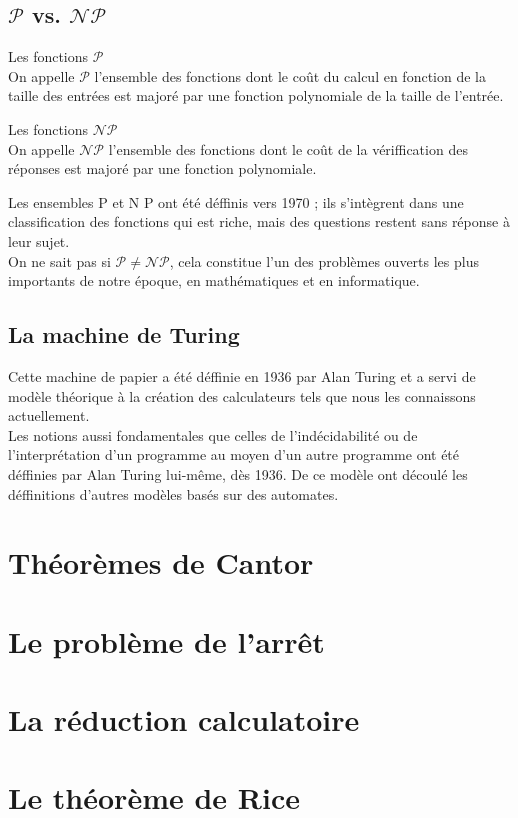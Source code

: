    \subsection{\(\mathcal{P}\) vs. \(\mathcal{NP}\)}

    \begin{definition}
        Les fonctions \(\mathcal{P}\)\\
        On appelle \(\mathcal{P}\) l'ensemble des fonctions dont le coût du calcul en fonction de la taille des entrées est majoré par une fonction polynomiale de la taille de l'entrée.
    \end{definition}
    \begin{definition}
        Les fonctions \(\mathcal{NP}\)\\
        On appelle \(\mathcal{NP}\) l'ensemble des fonctions dont le coût de la vériffication des réponses est majoré par une fonction polynomiale.
    \end{definition}

    \begin{result}
        Les ensembles P et N P ont été déffinis vers 1970 ; ils s'intègrent dans une classification des fonctions qui est riche, mais des questions restent sans réponse à leur sujet.\\
        On ne sait pas si \(\mathcal{P}\neq\mathcal{NP}\), cela constitue l'un des problèmes ouverts les plus importants de notre époque, en mathématiques et en informatique.
    \end{result}

    \subsection{La machine de Turing}
    Cette machine de papier a été déffinie en 1936 par Alan Turing et a servi de modèle théorique à la création des calculateurs tels que nous les connaissons actuellement.\\
    Les notions aussi fondamentales que celles de l'indécidabilité ou de l'interprétation d'un programme au moyen d'un autre programme ont été déffinies par Alan Turing lui-même, dès 1936. De ce modèle ont découlé les déffinitions d'autres modèles basés sur des automates.
    
  \section{Th\'eor\`emes de Cantor}\label{sec:theoremes_cantor}
  
  
  \section{Le probl\`eme de l'arrêt}\label{sec:probleme_arret}
  
  
  \section{La r\'eduction calculatoire}\label{sec:reduction_calculatoire}
  
  
  \section{Le th\'eor\`eme de Rice}\label{sec:theoreme_rice}
